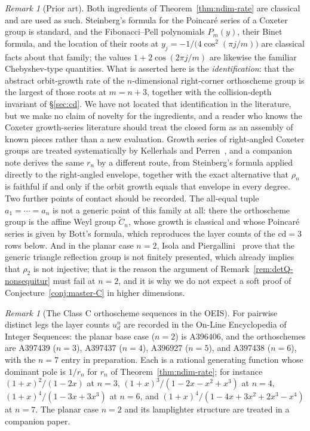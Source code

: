 \documentclass[11pt,a4paper]{article}
\theoremstyle{remark}
\newtheorem{remark}[theorem]{Remark}
\theoremstyle{plain}
\begin{document}
\begin{remark}[Prior art]\label{rem:priorart-1b}
Both ingredients of Theorem~\ref{thm:ndim-rate} are classical and are used as such.
Steinberg's formula for the Poincar\'e series of a Coxeter group is standard, and the
Fibonacci--Pell polynomials $P_m(y)$, their Binet formula, and the location of their roots at
$y_j=-1/\bigl(4\cos^2(\pi j/m)\bigr)$ are classical facts about that family; the values
$1+2\cos(2\pi j/m)$ are likewise the familiar Chebyshev-type quantities. What is asserted here is
the \emph{identification}: that the abstract orbit-growth rate of the $n$-dimensional right-corner
orthoscheme group is the largest of those roots at $m=n+3$, together with the collision-depth
invariant of \S\ref{sec:cd}. We have not located that identification in the literature, but we make
no claim of novelty for the ingredients, and a reader who knows the Coxeter growth-series literature
should treat the closed form as an assembly of known pieces rather than a new evaluation.
Growth series of right-angled Coxeter groups are treated systematically by
Kellerhals and Perren~\cite{kellerhals-perren}, and a companion note derives the
same $r_n$ by a different route, from Steinberg's formula applied directly to the
right-angled envelope, together with the exact alternative that $\rho_n$ is
faithful if and only if the orbit growth equals that envelope in every degree.
Two further points of contact should be recorded. The all-equal tuple
$a_1=\cdots=a_n$ is not a generic point of this family at all: there the
orthoscheme group is the affine Weyl group $\widetilde C_n$, whose growth is
classical and whose Poincar\'e series is given by Bott's formula, which
reproduces the layer counts of the $\mathrm{cd}=3$ rows below. And in the planar
case $n=2$, Isola and Piergallini~\cite{isola-piergallini} prove that the generic
triangle reflection group is not finitely presented, which already implies that
$\rho_2$ is not injective; that is the reason the argument of
Remark~\ref{rem:detQ-nonsequitur} must fail at $n=2$, and it is why we do not
expect a soft proof of Conjecture~\ref{conj:master-C} in higher dimensions.
\end{remark}

\begin{remark}[The Class C orthoscheme sequences in the OEIS]
\label{rem:oeis}
For pairwise distinct legs the layer counts $u_d^n$ are recorded in the
On-Line Encyclopedia of Integer Sequences: the planar base case ($n = 2$)
is A396406, and the orthoschemes are A397439 ($n = 3$), A397437 ($n = 4$),
A396927 ($n = 5$), and A397438 ($n = 6$), with the $n = 7$ entry in
preparation. Each is a rational generating function whose dominant pole is
$1/r_n$ for $r_n$ of Theorem~\ref{thm:ndim-rate}; for instance
$(1+x)^2/(1 - 2x)$ at $n = 3$, $(1+x)^3/(1 - 2x - x^2 + x^3)$ at $n = 4$,
$(1+x)^4/(1 - 3x + 3x^3)$ at $n = 6$, and
$(1+x)^4/(1 - 4x + 3x^2 + 2x^3 - x^4)$ at $n = 7$. The planar case $n = 2$
and its lamplighter structure are treated in a companion paper.
\end{remark}
\end{document}
